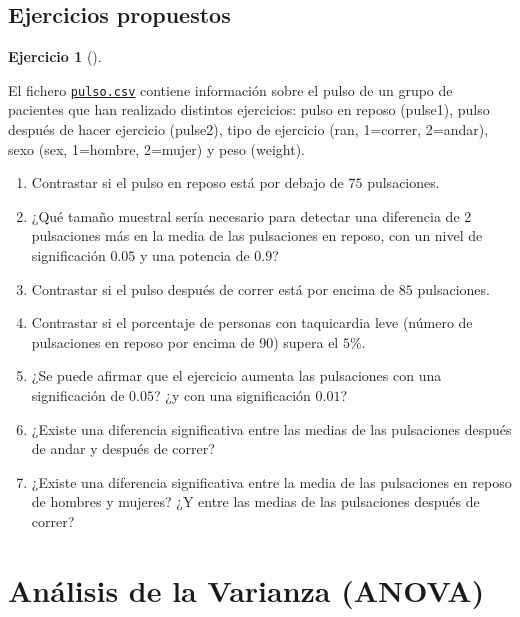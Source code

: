 \documentclass[
  a4paper,
]{scrreport}
\theoremstyle{definition}
\newtheorem{exercise}{Ejercicio}[chapter]
\theoremstyle{remark}
\begin{document}
\section{Ejercicios propuestos}\label{ejercicios-propuestos-6}

\begin{exercise}[]\protect\hypertarget{exr-contraste-hipotesis-pulso}{}\label{exr-contraste-hipotesis-pulso}

El fichero
\href{https://aprendeconalf.es/estadistica-practicas-r/datos/pulso.csv}{\texttt{pulso.csv}}
contiene información sobre el pulso de un grupo de pacientes que han
realizado distintos ejercicios: pulso en reposo (pulse1), pulso después
de hacer ejercicio (pulse2), tipo de ejercicio (ran, 1=correr, 2=andar),
sexo (sex, 1=hombre, 2=mujer) y peso (weight).

\begin{enumerate}
\def\labelenumi{\alph{enumi}.}
\item
  Contrastar si el pulso en reposo está por debajo de \(75\)
  pulsaciones.
\item
  ¿Qué tamaño muestral sería necesario para detectar una diferencia de 2
  pulsaciones más en la media de las pulsaciones en reposo, con un nivel
  de significación \(0.05\) y una potencia de \(0.9\)?
\item
  Contrastar si el pulso después de correr está por encima de \(85\)
  pulsaciones.
\item
  Contrastar si el porcentaje de personas con taquicardia leve (número
  de pulsaciones en reposo por encima de \(90\)) supera el \(5\%\).
\item
  ¿Se puede afirmar que el ejercicio aumenta las pulsaciones con una
  significación de \(0.05\)? ¿y con una significación \(0.01\)?
\item
  ¿Existe una diferencia significativa entre las medias de las
  pulsaciones después de andar y después de correr?
\item
  ¿Existe una diferencia significativa entre la media de las pulsaciones
  en reposo de hombres y mujeres? ¿Y entre las medias de las pulsaciones
  después de correr?
\end{enumerate}

\end{exercise}


\chapter{Análisis de la Varianza
(ANOVA)}\label{anuxe1lisis-de-la-varianza-anova}
\end{document}
